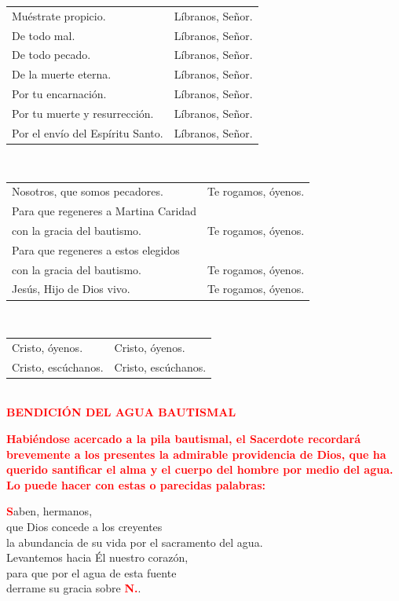 \documentclass[12pt, letterpaper]{report}
\begin{document}
\begin{tabular}{ll}
Mu\'estrate propicio.& L\'ibranos, Se\~nor. \\
De todo mal.& L\'ibranos, Se\~nor. \\
De todo pecado.& L\'ibranos, Se\~nor. \\
De la muerte eterna.& L\'ibranos, Se\~nor. \\
Por tu encarnaci\'on.& L\'ibranos, Se\~nor. \\
Por tu muerte y resurrecci\'on.& L\'ibranos, Se\~nor. \\
Por el env\'io del Esp\'iritu Santo.& L\'ibranos, Se\~nor.
\end{tabular} \newline \\

\begin{tabular}{ll}
Nosotros, que somos pecadores.& Te rogamos, \'oyenos. \\
Para que regeneres a Martina Caridad \\
con la gracia del bautismo.& Te rogamos, \'oyenos. \\
Para que regeneres a estos elegidos \\
con la gracia del bautismo.& Te rogamos, \'oyenos. \\
Jes\'us, Hijo de Dios vivo.& Te rogamos, \'oyenos.
\end{tabular} \newline \\

\begin{tabular}{ll}
Cristo, \'oyenos.& Cristo, \'oyenos. \\
Cristo, esc\'uchanos.& Cristo, esc\'uchanos. \\
\end{tabular} \newline \\

\Large {\bfseries \textcolor{red}{BENDICI\'ON DEL AGUA BAUTISMAL}} \newline

\large {\bfseries \textcolor{red}{Habi\'endose acercado a la pila bautismal, el Sacerdote recordar\'a brevemente a los presentes la admirable providencia de Dios, que ha querido santificar el alma y el cuerpo del hombre por medio del agua. Lo puede hacer con estas o parecidas palabras:}} \newline

\lettrine[lines=1]{\bfseries \textcolor{red}{S}}{}\Large aben, hermanos, \\ 
que Dios concede a los creyentes \\
la abundancia de su vida por el sacramento del agua. \\
Levantemos hacia \'El nuestro coraz\'on, \\
para que por el agua de esta fuente \\
derrame su gracia sobre {\bfseries \textcolor{red}{N.}}. \newline
\end{document}
